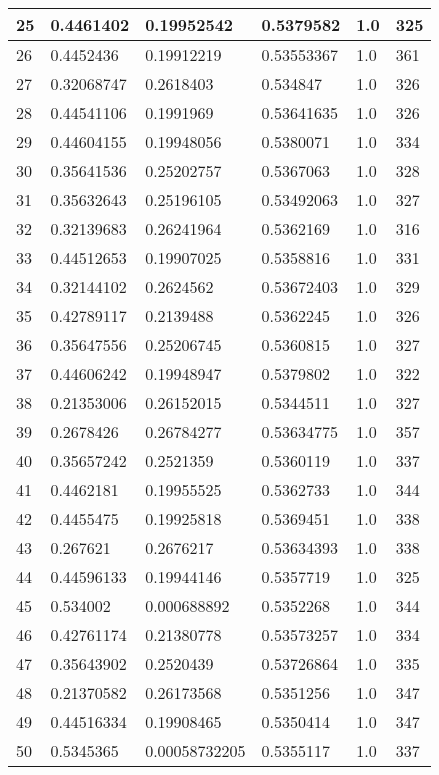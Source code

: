 \begin{longtable}{|l|l|l|l|l|l|}
25 & 0.4461402 & 0.19952542 & 0.5379582 & 1.0 & 325 \\ \hline 
26 & 0.4452436 & 0.19912219 & 0.53553367 & 1.0 & 361 \\ \hline 
27 & 0.32068747 & 0.2618403 & 0.534847 & 1.0 & 326 \\ \hline 
28 & 0.44541106 & 0.1991969 & 0.53641635 & 1.0 & 326 \\ \hline 
29 & 0.44604155 & 0.19948056 & 0.5380071 & 1.0 & 334 \\ \hline 
30 & 0.35641536 & 0.25202757 & 0.5367063 & 1.0 & 328 \\ \hline 
31 & 0.35632643 & 0.25196105 & 0.53492063 & 1.0 & 327 \\ \hline 
32 & 0.32139683 & 0.26241964 & 0.5362169 & 1.0 & 316 \\ \hline 
33 & 0.44512653 & 0.19907025 & 0.5358816 & 1.0 & 331 \\ \hline 
34 & 0.32144102 & 0.2624562 & 0.53672403 & 1.0 & 329 \\ \hline 
35 & 0.42789117 & 0.2139488 & 0.5362245 & 1.0 & 326 \\ \hline 
36 & 0.35647556 & 0.25206745 & 0.5360815 & 1.0 & 327 \\ \hline 
37 & 0.44606242 & 0.19948947 & 0.5379802 & 1.0 & 322 \\ \hline 
38 & 0.21353006 & 0.26152015 & 0.5344511 & 1.0 & 327 \\ \hline 
39 & 0.2678426 & 0.26784277 & 0.53634775 & 1.0 & 357 \\ \hline 
40 & 0.35657242 & 0.2521359 & 0.5360119 & 1.0 & 337 \\ \hline 
41 & 0.4462181 & 0.19955525 & 0.5362733 & 1.0 & 344 \\ \hline 
42 & 0.4455475 & 0.19925818 & 0.5369451 & 1.0 & 338 \\ \hline 
43 & 0.267621 & 0.2676217 & 0.53634393 & 1.0 & 338 \\ \hline 
44 & 0.44596133 & 0.19944146 & 0.5357719 & 1.0 & 325 \\ \hline 
45 & 0.534002 & 0.000688892 & 0.5352268 & 1.0 & 344 \\ \hline 
46 & 0.42761174 & 0.21380778 & 0.53573257 & 1.0 & 334 \\ \hline 
47 & 0.35643902 & 0.2520439 & 0.53726864 & 1.0 & 335 \\ \hline 
48 & 0.21370582 & 0.26173568 & 0.5351256 & 1.0 & 347 \\ \hline 
49 & 0.44516334 & 0.19908465 & 0.5350414 & 1.0 & 347 \\ \hline 
50 & 0.5345365 & 0.00058732205 & 0.5355117 & 1.0 & 337 \\ \hline 
\end{longtable}